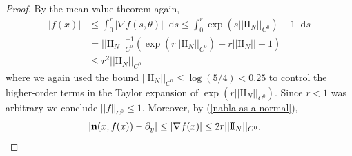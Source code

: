 \documentclass[reqno,11pt]{amsart}
\newcommand*\dif{\mathop{}\!\mathrm{d}}
\newcommand{\Two}{\mathrm{I\!I}}
\newcommand{\normal}{\mathbf n}
\theoremstyle{definition}
\numberwithin{equation}{section}
\begin{document}
\begin{proof}
	By the mean value theorem again,
\begin{align*}
	|f(x)| &\leq \int_0^r |\nabla f(s, \theta)| \dif s \leq \int_0^r \exp(s ||\Two_N||_{C^0}) - 1 \dif s \\
	&= ||\Two_N||_{C^0}^{-1} (\exp(r ||\Two_N||_{C^0}) - r||\Two_N|| - 1) \\
	&\leq r^2 ||\Two_N||_{C^0}
\end{align*}
	where we again used the bound $||\Two_N||_{C^0} \leq \log(5/4) < 0.25$ to control the higher-order terms in the Taylor expansion of $\exp(r ||\Two_N||_{C^0})$. Since $r < 1$ was arbitrary we conclude $||f||_{C^0} \leq 1$. Moreover, by (\ref{nabla as a normal}),
\begin{align*}
	|\normal(x, f(x)) - \partial_y| &\leq |\nabla f(x)| \leq 2r ||\Two_N||_{C^0}. \qedhere
\end{align*}
\end{proof}
\end{document}
